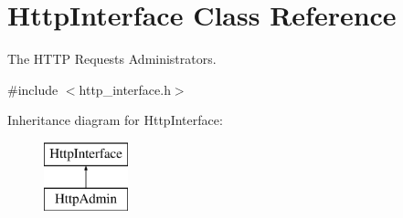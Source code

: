 \hypertarget{classHttpInterface}{\section{Http\-Interface Class Reference}
\label{classHttpInterface}
}


The H\-T\-T\-P Requests Administrators.  




{\ttfamily \#include $<$http\-\_\-interface.\-h$>$}

Inheritance diagram for Http\-Interface\-:\begin{figure}[H]
\begin{center}
\leavevmode
\includegraphics[height=2.000000cm]{classHttpInterface}
\end{center}
\end{figure}
